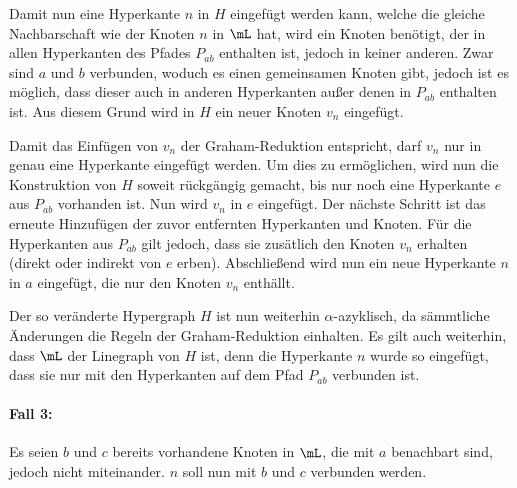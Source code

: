 \begin{Proof}
    Damit nun eine Hyperkante $n$ in $H$ eingefügt werden kann, welche die gleiche Nachbarschaft wie der Knoten $n$ in $\mL$ hat, wird ein Knoten benötigt, der in allen Hyperkanten des Pfades $P_{ab}$ enthalten ist, jedoch in keiner anderen. Zwar sind $a$ und $b$ verbunden, woduch es einen gemeinsamen Knoten gibt, jedoch ist es möglich, dass dieser auch in anderen Hyperkanten außer denen in $P_{ab}$ enthalten ist. Aus diesem Grund wird in $H$ ein neuer Knoten $v_n$ eingefügt.
    
    Damit das Einfügen von $v_n$ der Graham-Reduktion entspricht, darf $v_n$ nur in genau eine Hyperkante eingefügt werden. Um dies zu ermöglichen, wird nun die Konstruktion von $H$ soweit rückgängig gemacht, bis nur noch eine Hyperkante $e$ aus $P_{ab}$ vorhanden ist. Nun wird $v_n$ in $e$ eingefügt. Der nächste Schritt ist das erneute Hinzufügen der zuvor entfernten Hyperkanten und Knoten. Für die Hyperkanten aus $P_{ab}$ gilt jedoch, dass sie zusätlich den Knoten $v_n$ erhalten (direkt oder indirekt von $e$ erben). Abschließend wird nun ein neue Hyperkante $n$ in $a$ eingefügt, die nur den Knoten $v_n$ enthällt.
    
    Der so veränderte Hypergraph $H$ ist nun weiterhin $\alpha$-azyklisch, da sämmtliche Änderungen die Regeln der Graham-Reduktion einhalten. Es gilt auch weiterhin, dass $\mL$ der Linegraph von $H$ ist, denn die Hyperkante $n$ wurde so eingefügt, dass sie nur mit den Hyperkanten auf dem Pfad $P_{ab}$ verbunden ist.
    
    \paragraph{Fall 3:} Es seien $b$ und $c$ bereits vorhandene Knoten in $\mL$, die mit $a$ benachbart sind, jedoch nicht miteinander. $n$ soll nun mit $b$ und $c$ verbunden werden.
    
    \begin{figure}[htbp]
        \centering
\end{figure}
\end{Proof}
